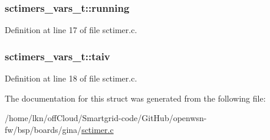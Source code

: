 \subsubsection[{\texorpdfstring{running}{running}}]{ sctimers\+\_\+vars\+\_\+t\+::running}\hypertarget{structsctimers__vars__t_a87a6fbe92af71397c7aa34f2372838e5}{}\label{structsctimers__vars__t_a87a6fbe92af71397c7aa34f2372838e5}


Definition at line 17 of file sctimer.\+c.

\subsubsection[{\texorpdfstring{taiv}{taiv}}]{ sctimers\+\_\+vars\+\_\+t\+::taiv}\hypertarget{structsctimers__vars__t_a8add2ed664d7980fb33696d616ae8dbf}{}\label{structsctimers__vars__t_a8add2ed664d7980fb33696d616ae8dbf}


Definition at line 18 of file sctimer.\+c.



The documentation for this struct was generated from the following file\+:\begin{DoxyCompactItemize}
\item 
/home/lkn/off\+Cloud/\+Smartgrid-\/code/\+Git\+Hub/openwsn-\/fw/bsp/boards/gina/\hyperlink{gina_2sctimer_8c}{sctimer.\+c}\end{DoxyCompactItemize}
